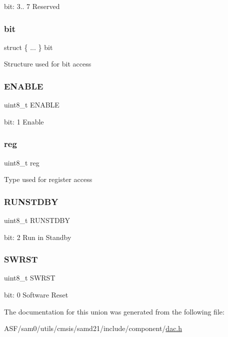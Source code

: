 bit\+: 3.. 7 Reserved \mbox{\label{union_d_a_c___c_t_r_l_a___type_a168eb3cc5c511144f111f4d91e3179c4}} 
\subsubsection{\texorpdfstring{bit}{bit}}
{\footnotesize\ttfamily struct \{ ... \}   bit}

Structure used for bit access \mbox{\label{union_d_a_c___c_t_r_l_a___type_a2b3662f1b123463ae1a23c1f324e5cc5}} 
\subsubsection{\texorpdfstring{ENABLE}{ENABLE}}
{\footnotesize\ttfamily uint8\+\_\+t E\+N\+A\+B\+LE}

bit\+: 1 Enable \mbox{\label{union_d_a_c___c_t_r_l_a___type_a9428adc9af4653a2050e2536b55dec8d}} 
\subsubsection{\texorpdfstring{reg}{reg}}
{\footnotesize\ttfamily uint8\+\_\+t reg}

Type used for register access \mbox{\label{union_d_a_c___c_t_r_l_a___type_aa24338c5cacc63e3b77adf2dc0938ff6}} 
\subsubsection{\texorpdfstring{RUNSTDBY}{RUNSTDBY}}
{\footnotesize\ttfamily uint8\+\_\+t R\+U\+N\+S\+T\+D\+BY}

bit\+: 2 Run in Standby \mbox{\label{union_d_a_c___c_t_r_l_a___type_a9334d5ac0548802c90a8129c52c8e490}} 
\subsubsection{\texorpdfstring{SWRST}{SWRST}}
{\footnotesize\ttfamily uint8\+\_\+t S\+W\+R\+ST}

bit\+: 0 Software Reset 

The documentation for this union was generated from the following file\+:\begin{DoxyCompactItemize}
\item 
A\+S\+F/sam0/utils/cmsis/samd21/include/component/\mbox{\hyperlink{component_2dac_8h}{dac.\+h}}\end{DoxyCompactItemize}
